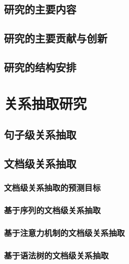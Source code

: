 \documentclass[bachelor]{thesis-uestc}
\begin{document}
\section{研究的主要内容}

\section{研究的主要贡献与创新}

\section{研究的结构安排}

\begin{comment}
    课题的方案论证，包括课题的主要任务，功能要求，性能指标等
    课题的工作
    A. 理论课题
(a) 理论基础和原理
(b) 理论分析、推导、数学模型
(c) 模型仿真（含数据、曲线等）

also: 图表的标注先写在图表的上方，明天再次询问这个问题
\end{comment}
\chapter{关系抽取研究}

\section{句子级关系抽取}

\section{文档级关系抽取}

\subsection{文档级关系抽取的预测目标}

\subsection{基于序列的文档级关系抽取}

\subsection{基于注意力机制的文档级关系抽取}

\subsection{基于语法树的文档级关系抽取}
\end{document}
